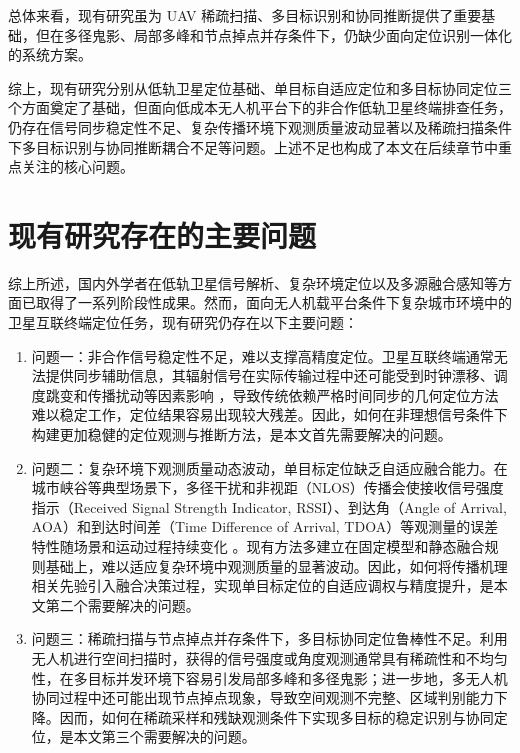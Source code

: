 总体来看，现有研究虽为 UAV 稀疏扫描、多目标识别和协同推断提供了重要基础，但在多径鬼影、局部多峰和节点掉点并存条件下，仍缺少面向定位识别一体化的系统方案。

综上，现有研究分别从低轨卫星定位基础、单目标自适应定位和多目标协同定位三个方面奠定了基础，但面向低成本无人机平台下的非合作低轨卫星终端排查任务，仍存在信号同步稳定性不足、复杂传播环境下观测质量波动显著以及稀疏扫描条件下多目标识别与协同推断耦合不足等问题。上述不足也构成了本文在后续章节中重点关注的核心问题。

\section{现有研究存在的主要问题}
\label{sec:1_3}
综上所述，国内外学者在低轨卫星信号解析、复杂环境定位以及多源融合感知等方面已取得了一系列阶段性成果。然而，面向无人机载平台条件下复杂城市环境中的卫星互联终端定位任务，现有研究仍存在以下主要问题：
\begin{enumerate}[label=,leftmargin=0pt,itemindent=2em]
    \item 问题一：非合作信号稳定性不足，难以支撑高精度定位。卫星互联终端通常无法提供同步辅助信息，其辐射信号在实际传输过程中还可能受到时钟漂移、调度跳变和传播扰动等因素影响 \cite{Qin2025Timing}，导致传统依赖严格时间同步的几何定位方法难以稳定工作，定位结果容易出现较大残差。因此，如何在非理想信号条件下构建更加稳健的定位观测与推断方法，是本文首先需要解决的问题。
    \item 问题二：复杂环境下观测质量动态波动，单目标定位缺乏自适应融合能力。在城市峡谷等典型场景下，多径干扰和非视距（NLOS）传播会使接收信号强度指示（Received Signal Strength Indicator, RSSI）、到达角（Angle of Arrival, AOA）和到达时间差（Time Difference of Arrival, TDOA）等观测量的误差特性随场景和运动过程持续变化 \cite{Wang2013TDOANLOS,Dickerson2025TDOA}。现有方法多建立在固定模型和静态融合规则基础上，难以适应复杂环境中观测质量的显著波动。因此，如何将传播机理相关先验引入融合决策过程，实现单目标定位的自适应调权与精度提升，是本文第二个需要解决的问题。
    \item 问题三：稀疏扫描与节点掉点并存条件下，多目标协同定位鲁棒性不足。利用无人机进行空间扫描时，获得的信号强度或角度观测通常具有稀疏性和不均匀性，在多目标并发环境下容易引发局部多峰和多径鬼影；进一步地，多无人机协同过程中还可能出现节点掉点现象，导致空间观测不完整、区域判别能力下降。因而，如何在稀疏采样和残缺观测条件下实现多目标的稳定识别与协同定位，是本文第三个需要解决的问题。
\end{enumerate}

